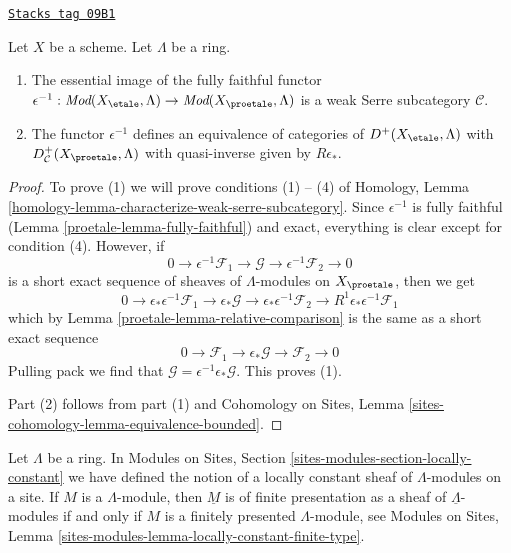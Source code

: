 \begin{lemma}
\label{proetale-lemma-compare-derived}
\href{https://stacks.math.columbia.edu/tag/09B1}{\texttt{Stacks tag 09B1}}

Let $X$ be a scheme. Let $\Lambda$ be a ring.
\begin{enumerate}
\item The essential image of the fully faithful functor
$\epsilon^{-1} : \textit{Mod}(X_\etale, \Lambda) \to
\textit{Mod}(X_\proetale, \Lambda)$
is a weak Serre subcategory $\mathcal{C}$.
\item The functor $\epsilon^{-1}$ defines an equivalence of categories
of $D^+(X_\etale, \Lambda)$ with $D^+_\mathcal{C}(X_\proetale, \Lambda)$
with quasi-inverse given by $R\epsilon_*$.
\end{enumerate}
\end{lemma}

\begin{proof}

To prove (1) we will prove conditions (1) -- (4) of
Homology, Lemma \ref{homology-lemma-characterize-weak-serre-subcategory}.
Since $\epsilon^{-1}$ is fully faithful (Lemma \ref{proetale-lemma-fully-faithful})
and exact, everything is clear except for condition (4).
However, if
$$
0 \to \epsilon^{-1}\mathcal{F}_1 \to \mathcal{G} \to
\epsilon^{-1}\mathcal{F}_2 \to 0
$$
is a short exact sequence of sheaves of $\Lambda$-modules on $X_\proetale$,
then we get
$$
0 \to \epsilon_*\epsilon^{-1}\mathcal{F}_1 \to \epsilon_*\mathcal{G} \to
\epsilon_*\epsilon^{-1}\mathcal{F}_2 \to
R^1\epsilon_*\epsilon^{-1}\mathcal{F}_1
$$
which by Lemma \ref{proetale-lemma-relative-comparison}
is the same as a short exact sequence
$$
0 \to \mathcal{F}_1 \to \epsilon_*\mathcal{G} \to \mathcal{F}_2 \to 0
$$
Pulling pack we find that $\mathcal{G} = \epsilon^{-1}\epsilon_*\mathcal{G}$.
This proves (1).

\medskip\noindent
Part (2) follows from part (1) and Cohomology on Sites,
Lemma \ref{sites-cohomology-lemma-equivalence-bounded}.
\end{proof}

Let $\Lambda$ be a ring. In
Modules on Sites, Section \ref{sites-modules-section-locally-constant}
we have defined the notion of a locally constant sheaf of $\Lambda$-modules
on a site. If $M$ is a $\Lambda$-module, then $\underline{M}$ is of finite
presentation as a sheaf of $\underline{\Lambda}$-modules if and only
if $M$ is a finitely presented $\Lambda$-module, see
Modules on Sites, Lemma \ref{sites-modules-lemma-locally-constant-finite-type}.

